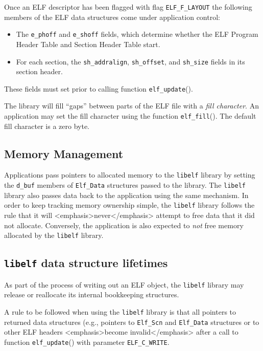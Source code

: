 \documentclass[a4paper]{book}
\newcommand{\constant}[1]{\texttt{#1}}
\newcommand{\function}[1]{\texttt{#1}()}
\newcommand{\firstterm}[1]{\textit{#1}}                 %
\newcommand{\library}[1]{\texttt{#1}}
\newcommand{\parameter}[1]{\texttt{#1}}
\newcommand{\type}[1]{\texttt{#1}}
\begin{document}
Once an ELF descriptor has been flagged with flag
\constant{ELF\_F\_LAYOUT} the following members of the ELF data
structures come under application control:

\begin{itemize}
\item The \parameter{e\_phoff} and \parameter{e\_shoff} fields, which
  determine whether the ELF Program Header Table and Section Header
  Table start.
\item For each section, the \parameter{sh\_addralign},
  \parameter{sh\_offset}, and \parameter{sh\_size} fields in its
  section header.
\end{itemize}

These fields must set prior to calling function
\function{elf\_update}.

The library will fill ``gaps'' between parts of the ELF file with a
\firstterm{fill character}.  An application may set the fill character
using the function \function{elf\_fill}.  The default fill character
is a zero byte.

\subsection{Memory Management}

Applications pass pointers to allocated memory to the \library{libelf}
library by setting the \parameter{d\_buf} members of \type{Elf\_Data}
structures passed to the library.  The \library{libelf} library also
passes data back to the application using the same mechanism.  In
order to keep tracking memory ownership simple, the \library{libelf}
library follows the rule that it will <emphasis>never</emphasis>
attempt to free data that it did not allocate.  Conversely, the
application is also expected to \emph{not} free memory allocated by
the \library{libelf} library.

\subsection{\library{libelf} data structure lifetimes}
As part of the process of writing out an ELF object, the
\library{libelf} library may release or reallocate its internal
bookkeeping structures.

A rule to be followed when using the \library{libelf} library is that
all pointers to returned data structures (e.g., pointers to
\type{Elf\_Scn} and \type{Elf\_Data} structures or to other ELF
headers <emphasis>become invalid</emphasis> after a call to function
\function{elf\_update} with parameter \constant{ELF\_C\_WRITE}.
\end{document}
